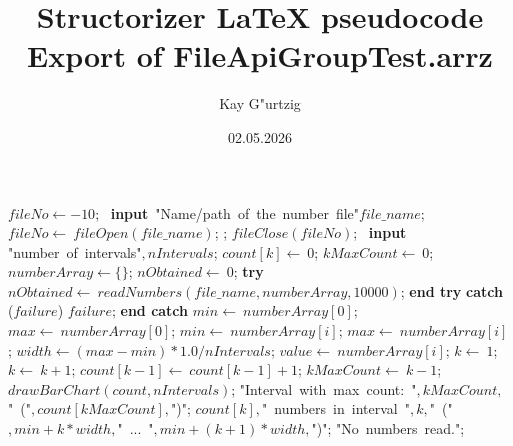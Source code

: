 \documentclass[a4paper,10pt]{article}
\title{Structorizer LaTeX pseudocode Export of FileApiGroupTest.arrz}
\author{Kay G"urtzig}
\date{02.05.2026}
\begin{document}
\begin{algorithm}
\caption{DrawRandomHistogram()}
\begin{algorithmic}[5]

\STATE {}
\STATE {}
  \STATE \(fileNo\gets-10\);
  \REPEAT
    \STATE\ \textbf{input}\ \(\)"{}Name/path\ of\ the\ number\ file"{}\(file\_name\);
    \STATE \(fileNo\gets\ fileOpen(file\_name)\);
  ;
    \STATE \(fileClose(fileNo)\);
    \STATE\ \textbf{input}\ \(\)"{}number\ of\ intervals"{}\(,nIntervals\);
      \STATE \(count[k]\gets\ 0\);
    \ENDFOR
    \STATE \(kMaxCount\gets\ 0\);
    \STATE \(numberArray\gets\{\}\);
    \STATE \(nObtained\gets\ 0\);
    \STATE \textbf{try}  \BODY
      \STATE \(nObtained\gets\ readNumbers(file\_name,numberArray,10000)\);
    \ENDBODY \STATE \textbf{end try}
    \STATE \textbf{catch} (\(failure\)) \BODY
      \PRINT\(failure\);
    \ENDBODY \STATE \textbf{end catch}
      \STATE \(min\gets\ numberArray[0]\);
      \STATE \(max\gets\ numberArray[0]\);
          \STATE \(min\gets\ numberArray[i]\);
        \ELSE
            \STATE \(max\gets\ numberArray[i]\);
          \ENDIF
        \ENDIF
      \ENDFOR
      \STATE \(width\gets(max-min)*1.0/nIntervals\);
        \STATE \(value\gets\ numberArray[i]\);
        \STATE \(k\gets\ 1\);
          \STATE \(k\gets\ k+1\);
        \ENDWHILE
        \STATE \(count[k-1]\gets\ count[k-1]+1\);
          \STATE \(kMaxCount\gets\ k-1\);
        \ENDIF
      \ENDFOR
      \STATE \(drawBarChart(count,nIntervals)\);
      \PRINT\(\)"{}Interval\ with\ max\ count:\ "{}\(,kMaxCount,\)"{}\ ("{}\(,count[kMaxCount],\)"{})"{}\(\);
        \PRINT\(count[k],\)"{}\ numbers\ in\ interval\ "{}\(,k,\)"{}\ ("{}\(,min+k*width,\)"{}\ ...\ "{}\(,min+(k+1)*width,\)"{})"{}\(\);
      \ENDFOR
    \ELSE
      \PRINT\(\)"{}No\ numbers\ read."{}\(\);
    \ENDIF
  \ENDIF

\end{algorithmic}
\end{algorithm}
\end{document}
